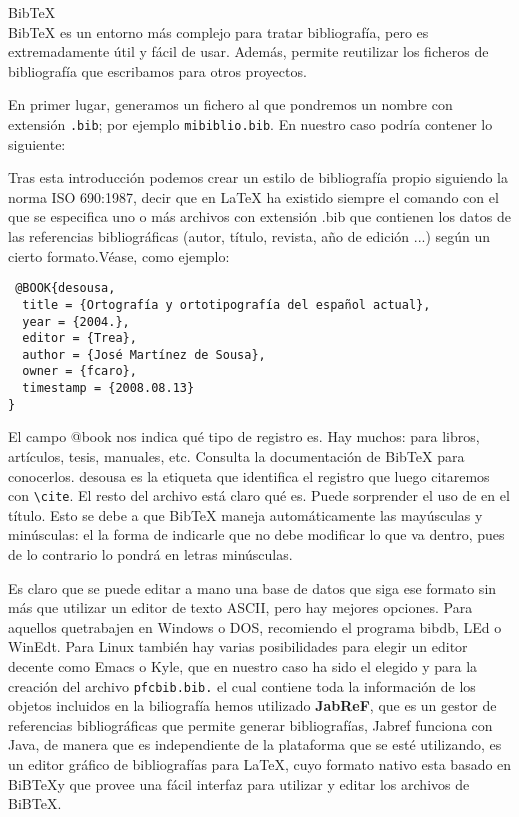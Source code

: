 \noindent BibTeX\\

BibTeX es un entorno más complejo para tratar bibliografía, pero es extremadamente útil y fácil de usar. Además, permite reutilizar los ficheros de bibliografía que escribamos para otros
proyectos.

En primer lugar, generamos un fichero al que pondremos un nombre con extensión \verb|.bib|; por ejemplo \verb|mibiblio.bib|. En nuestro caso podría contener lo siguiente:


Tras esta introducción podemos crear un estilo de bibliografía propio siguiendo la norma ISO 690:1987, decir que en \LaTeX{}  ha existido siempre el comando \verb|| con el que se especifica  uno o más archivos  con extensión .bib que contienen los datos  de las referencias bibliográficas (autor, título, revista, año de edición ...) según un cierto formato.Véase,  como ejemplo:

\begin{verbatim}
 @BOOK{desousa,
  title = {Ortografía y ortotipografía del español actual},
  year = {2004.},
  editor = {Trea},
  author = {José Martínez de Sousa},
  owner = {fcaro},
  timestamp = {2008.08.13}
}
\end{verbatim}

El campo @book nos indica qué tipo de registro es. Hay muchos: para libros, artículos, tesis, manuales, etc. Consulta la documentación de BibTeX para conocerlos. desousa es la etiqueta que identifica el registro que luego citaremos con \verb|\cite|. El resto del archivo está claro qué es. Puede sorprender el uso de {} en el título. Esto se debe a que BibTeX maneja automáticamente las mayúsculas y minúsculas: el la forma de indicarle que no debe modificar lo que va dentro, pues de lo contrario lo pondrá en letras minúsculas.

Es claro que se puede editar a mano una base de datos que siga ese formato sin más que utilizar un editor de texto ASCII, pero hay mejores opciones. Para aquellos quetrabajen en Windows o DOS, recomiendo el programa bibdb, LEd o WinEdt.
Para Linux también hay varias posibilidades para elegir un editor decente como Emacs o Kyle, que en nuestro caso ha sido el elegido y para la creación del archivo \verb|pfcbib.bib.| el cual contiene toda la información de los objetos incluidos en la biliografía hemos utilizado \textbf{JabReF}, que es un gestor de referencias bibliográficas que permite generar bibliografías, Jabref funciona con Java, de manera que es independiente de la plataforma que se esté utilizando, es un editor gráfico de bibliografías para \LaTeX, cuyo formato nativo esta basado en BiB\TeX y que provee una fácil interfaz para utilizar  y editar los archivos de BiB\TeX.

